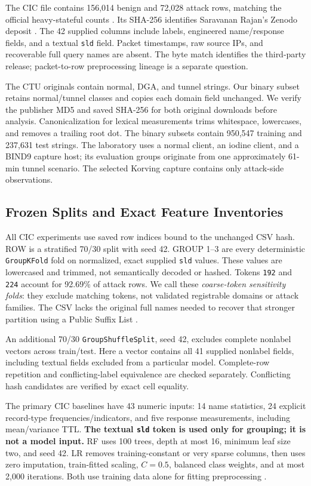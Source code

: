 \documentclass[conference]{IEEEtran}
\newcommand{\code}[1]{\texttt{#1}}
\begin{document}
The CIC file contains 156,014 benign and 72,028 attack rows, matching the official heavy-stateful counts \cite{cicdata}. Its SHA-256 identifies Saravanan Rajan's Zenodo deposit \cite{cicmirror}. The 42 supplied columns include labels, engineered name/response fields, and a textual \code{sld} field. Packet timestamps, raw source IPs, and recoverable full query names are absent. The byte match identifies the third-party release; packet-to-row preprocessing lineage is a separate question.

The CTU originals contain normal, DGA, and tunnel strings. Our binary subset retains normal/tunnel classes and copies each domain field unchanged. We verify the publisher MD5 and saved SHA-256 for both original downloads before analysis. Canonicalization for lexical measurements trims whitespace, lowercases, and removes a trailing root dot. The binary subsets contain 950,547 training and 237,631 test strings. The laboratory uses a normal client, an iodine client, and a BIND9 capture host; its evaluation groups originate from one approximately 61-min tunnel scenario. The selected Korving capture \cite{korving} contains only attack-side observations.

\subsection{Frozen Splits and Exact Feature Inventories}
All CIC experiments use saved row indices bound to the unchanged CSV hash. ROW is a stratified 70/30 split with seed 42. GROUP 1--3 are every deterministic \code{GroupKFold} fold on normalized, exact supplied \code{sld} values. These values are lowercased and trimmed, not semantically decoded or hashed. Tokens \code{192} and \code{224} account for 92.69\% of attack rows. We call these \emph{coarse-token sensitivity folds}: they exclude matching tokens, not validated registrable domains or attack families. The CSV lacks the original full names needed to recover that stronger partition using a Public Suffix List \cite{psl}.

An additional 70/30 \code{GroupShuffleSplit}, seed 42, excludes complete nonlabel vectors across train/test. Here a vector contains all 41 supplied nonlabel fields, including textual fields excluded from a particular model. Complete-row repetition and conflicting-label equivalence are checked separately. Conflicting hash candidates are verified by exact cell equality.

The primary CIC baselines have 43 numeric inputs: 14 name statistics, 24 explicit record-type frequencies/indicators, and five response measurements, including mean/variance TTL. \textbf{The textual \code{sld} token is used only for grouping; it is not a model input.} RF uses 100 trees, depth at most 16, minimum leaf size two, and seed 42. LR removes training-constant or very sparse columns, then uses zero imputation, train-fitted scaling, $C=0.5$, balanced class weights, and at most 2,000 iterations. Both use training data alone for fitting preprocessing \cite{sklearnpitfalls}.
\end{document}
